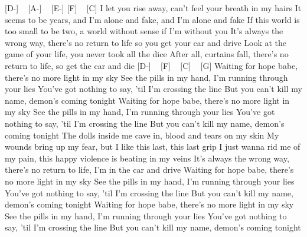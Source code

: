 
[D-] ~ [A-] ~ [E-] [F] ~ [C]
I let you rise away, can't feel your breath in my hairs
It seems to be years, and I'm alone and fake, and I'm alone and fake
If this world is too small to be two, a world without sense if I'm without you
It's always the wrong way, there's no return to life so you get your car and drive
Look at the game of your life, you never took all the dice
After all, curtains fall, there's no return to life, so get the car and die
[D-] ~ [F] ~ [C] ~ [G]
Waiting for hope babe, there's no more light in my sky
See the pills in my hand, I'm running through your lies
You've got nothing to say, 'til I'm crossing the line
But you can't kill my name, demon's coming tonight
Waiting for hope babe, there's no more light in my sky
See the pills in my hand, I'm running through your lies
You've got nothing to say, 'til I'm crossing the line
But you can't kill my name, demon's coming tonight
The dolls inside me cave in, blood and tears on my skin
My wounds bring up my fear, but I like this last, this last grip
I just wanna rid me of my pain, this happy violence is beating in my veins
It's always the wrong way, there's no return to life, I'm in the car and drive
Waiting for hope babe, there's no more light in my sky
See the pills in my hand, I'm running through your lies
You've got nothing to say, 'til I'm crossing the line
But you can't kill my name, demon's coming tonight
Waiting for hope babe, there's no more light in my sky
See the pills in my hand, I'm running through your lies
You've got nothing to say, 'til I'm crossing the line
But you can't kill my name, demon's coming tonight
